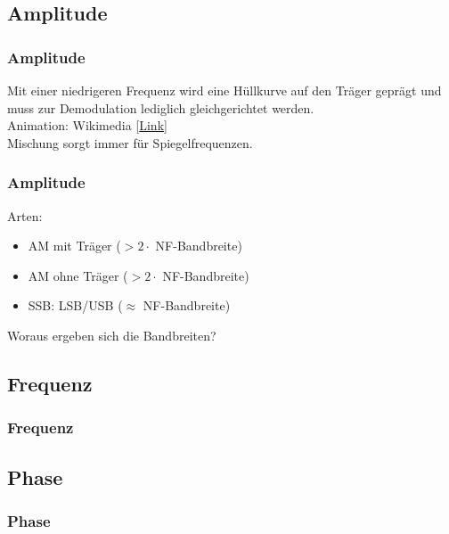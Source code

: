 \subsection{Amplitude}

\begin{frame}
    \frametitle{Amplitude}

    Mit einer niedrigeren Frequenz wird eine Hüllkurve auf den Träger geprägt
    und muss zur Demodulation lediglich gleichgerichtet werden. \\[2em]

    Animation: Wikimedia [\href{http://commons.wikimedia.org/wiki/File:Amfm3-en-de.gif}{Link}]
    \\[2em]

    Mischung sorgt immer für Spiegelfrequenzen.

\end{frame}

\begin{frame}
    \frametitle{Amplitude}

    Arten:

    \begin{itemize}
        \item AM mit Träger ($> 2 \cdot$ NF-Bandbreite)
        \item AM ohne Träger ($> 2 \cdot$ NF-Bandbreite)
        \item SSB: LSB/USB ($\approx$ NF-Bandbreite)
    \end{itemize}


    \vspace{2em} Woraus ergeben sich die Bandbreiten?

\end{frame}

\subsection{Frequenz}

\begin{frame}
    \frametitle{Frequenz}


\end{frame}

\subsection{Phase}

\begin{frame}
    \frametitle{Phase}

\end{frame}

